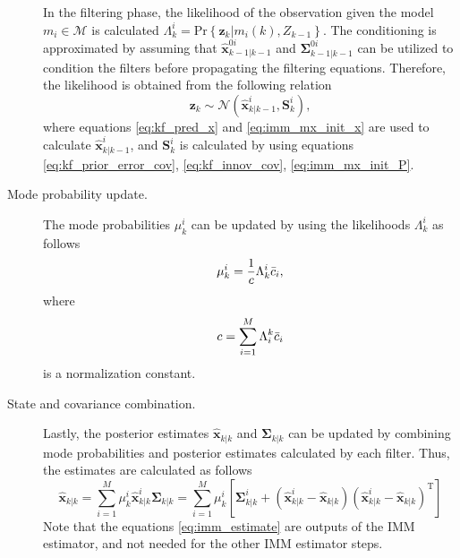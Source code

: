 \documentclass[english, 12pt, a4paper, elec, utf8, a-1b, online]{aaltothesis}
\renewcommand{\Pr}[1]{\text{Pr}\left\{ #1 \right\}}
\newcommand{\xpost}{\hat{\vec{x}}_{k|k}}
\newcommand{\postecov}{\boldsymbol{\Sigma}_{k|k}}
\renewcommand{\vec}[1]{\mathbf{#1}}
\newcommand{\z}{\bm{z}_k}
\newcommand{\normal}[2]{\mathcal{N}\left(#1, #2 \right)}
\newcommand{\transpose}[1]{#1^\text{T}}
\newcommand{\mxnorm}{ \Bar{c}_i }
\newcommand{\xmxinit}{\hat{\vec{x}}^{0i}_{k-1|k-1}}
\newcommand{\ecovmxinit}{\bm{\Sigma}^{0i}_{k-1|k-1}}
\newcommand{\modexprior}{\hat{\vec{x}}^{i}_{k|k-1}}
\newcommand{\modeinnovcov}{\mathbf{S}^i_{k}}
\newcommand{\modexpost}{\hat{\vec{x}}^{i}_{k|k}}
\newcommand{\modecovpost}{\bm{\Sigma}^i_{k|k}}
\begin{document}
\begin{description}
In the filtering phase, the likelihood of the observation given the model $m_i \in \mathcal{M}$ is calculated  $\Lambda^i_k = \Pr{\z | m_i(k), Z_{k-1}} $.
The conditioning is approximated by assuming that $\xmxinit$ and $\ecovmxinit$ can be utilized to condition the filters before propagating the filtering equations.
Therefore, the likelihood is obtained from the following relation
\begin{equation}
    \z \sim \normal{\modexprior}{\modeinnovcov},
\end{equation}
where equations \eqref{eq:kf_pred_x} and \eqref{eq:imm_mx_init_x} are used to calculate $\modexprior$, and $\modeinnovcov$ is calculated by using equations \eqref{eq:kf_prior_error_cov}, \eqref{eq:kf_innov_cov}, \eqref{eq:imm_mx_init_P}.

\item[Mode probability update.]

The mode probabilities $\mu^i_k$ can be updated by using the likelihoods $\Lambda_k^i$ as follows
\begin{equation}
    \mu_k^i = \frac{1}{c} \Lambda^i_k \mxnorm,
\end{equation}
where
\begin{equation}
    c = \sum_{i=1}^M \Lambda_i^k \mxnorm
\end{equation}
is a normalization constant.

\item[State and covariance combination.]
Lastly, the posterior estimates $\xpost$ and $\postecov$ can be updated by combining mode probabilities and posterior estimates calculated by each filter.
Thus, the estimates are calculated as follows
\begin{subequations}
\label{eq:imm_estimate}
\begin{equation}
    \xpost = \sum_{i=1}^M \mu_k^i \modexpost
\end{equation}
\begin{equation}
    \postecov = \sum_{i=1}^M \mu_k^i 
    \left[ 
        \modecovpost + \left( \modexpost - \xpost \right) \transpose{\left( \modexpost - \xpost \right)}
    \right]
\end{equation}
\end{subequations}
Note that the equations \eqref{eq:imm_estimate} are outputs of the IMM estimator, and not needed for the other IMM estimator steps.
\end{description}
\end{document}
